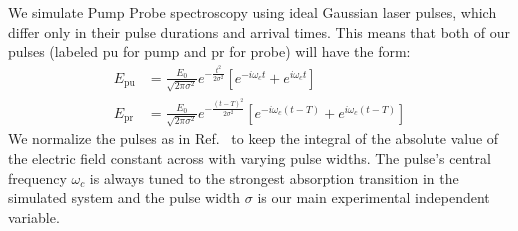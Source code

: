 We simulate Pump Probe spectroscopy using ideal Gaussian laser pulses, which differ only in their pulse durations and arrival times.  This means that both of our pulses (labeled pu for pump and pr for probe) will have the form:
\begin{align}
	E_{\text{pu}} &= \frac{E_0}{\sqrt{2 \pi \sigma^2}} e^{-\frac{t^2}{2 \sigma^2} } \left[ e^{-i \omega_c t} + e^{i \omega_c t} \right]\\
	E_{\text{pr}} &= \frac{E_0}{\sqrt{2 \pi \sigma^2}} e^{-\frac{\left(t-T\right)^2}{2 \sigma^2} } \left[ e^{-i \omega_c \left(t-T\right)} + e^{i \omega_c \left(t-T\right)} \right]
\end{align}
We normalize the pulses as in Ref.~\cite{allanWitness} to keep the integral of the absolute value of the electric field constant across with varying pulse widths.  The pulse's central frequency $\omega_c$ is always tuned to the strongest absorption transition in the simulated system and the pulse width $\sigma$ is our main experimental independent variable.

